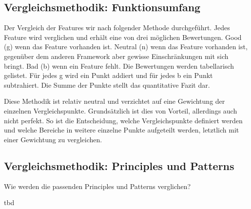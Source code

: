 \newpage

\subsection{Vergleichsmethodik: Funktionsumfang}
Der Vergleich der Features wir nach folgender Methode durchgeführt.
Jedes Feature wird verglichen und erhält eine von drei möglichen Bewertungen.
Good (g) wenn das Feature vorhanden ist.
Neutral (n) wenn das Feature vorhanden ist, gegenüber dem anderen Framework aber gewisse Einschränkungen mit sich bringt.
Bad (b) wenn ein Feature fehlt.
Die Bewertungen werden tabellarisch gelistet.
Für jedes g wird ein Punkt addiert und für jedes b ein Punkt subtrahiert.
Die Summe der Punkte stellt das quantitative Fazit dar.

Diese Methodik ist relativ neutral und verzichtet auf eine Gewichtung der einzelnen Vergleichspunkte.
Grundsätzlich ist dies von Vorteil, allerdings auch nicht perfekt.
So ist die Entscheidung, welche Vergleichspunkte definiert werden und welche Bereiche in weitere einzelne Punkte aufgeteilt werden, letztlich mit einer Gewichtung zu vergleichen.

\subsection{Vergleichsmethodik: Principles und Patterns}
\color{red}
Wie werden die passenden Principles und Patterns verglichen?

tbd
\color{black}
